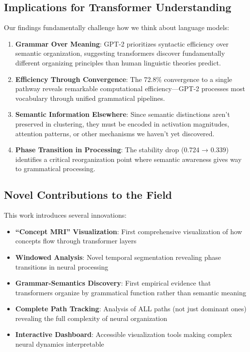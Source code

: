 \subsection{Implications for Transformer Understanding}

Our findings fundamentally challenge how we think about language models:

\begin{enumerate}
    \item \textbf{Grammar Over Meaning}: GPT-2 prioritizes syntactic efficiency over semantic organization, suggesting transformers discover fundamentally different organizing principles than human linguistic theories predict.
    
    \item \textbf{Efficiency Through Convergence}: The 72.8\% convergence to a single pathway reveals remarkable computational efficiency—GPT-2 processes most vocabulary through unified grammatical pipelines.
    
    \item \textbf{Semantic Information Elsewhere}: Since semantic distinctions aren't preserved in clustering, they must be encoded in activation magnitudes, attention patterns, or other mechanisms we haven't yet discovered.
    
    \item \textbf{Phase Transition in Processing}: The stability drop (0.724 → 0.339) identifies a critical reorganization point where semantic awareness gives way to grammatical processing.
\end{enumerate}

\subsection{Novel Contributions to the Field}

This work introduces several innovations:

\begin{itemize}
    \item \textbf{``Concept MRI'' Visualization}: First comprehensive visualization of how concepts flow through transformer layers
    \item \textbf{Windowed Analysis}: Novel temporal segmentation revealing phase transitions in neural processing
    \item \textbf{Grammar-Semantics Discovery}: First empirical evidence that transformers organize by grammatical function rather than semantic meaning
    \item \textbf{Complete Path Tracking}: Analysis of ALL paths (not just dominant ones) revealing the full complexity of neural organization
    \item \textbf{Interactive Dashboard}: Accessible visualization tools making complex neural dynamics interpretable
\end{itemize}

